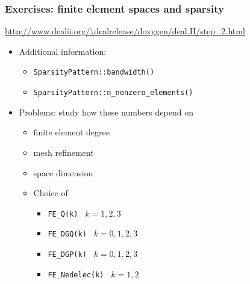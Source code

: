 \begin{frame}
  \frametitle{Exercises: finite element spaces and sparsity}
  {\footnotesize{\url{http://www.dealii.org/\dealrelease/doxygen/deal.II/step_2.html}}}
  \begin{itemize}
  \item Additional information:
    \begin{itemize}
    \item \texttt{SparsityPattern::bandwidth()}
    \item \texttt{SparsityPattern::n\_nonzero\_elements()}
    \end{itemize}
  \item Problems: study how these numbers depend on
    \begin{itemize}
    \item finite element degree
    \item mesh refinement
    \item space dimension
    \item Choice of
      \begin{itemize}
      \item \lstinline!FE_Q(k) ! $k=1,2,3$
      \item \lstinline!FE_DGQ(k) ! $k=0,1,2,3$
      \item \lstinline!FE_DGP(k) ! $k=0,1,2,3$
      \item \lstinline!FE_Nedelec(k) ! $k=1,2$
      \end{itemize}
    \end{itemize}
  \end{itemize}
\end{frame}
